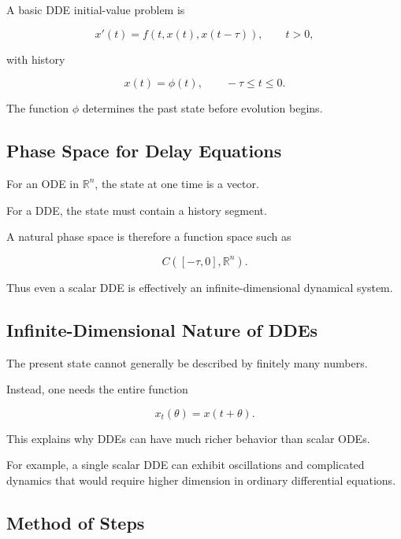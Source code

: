 A basic DDE initial-value problem is

\[
\boxed{
x'(t)
=
f
\left(
t,
x(t),
x(t-\tau)
\right),
\qquad
t>0,
}
\]

with history

\[
\boxed{
x(t)
=
\phi(t),
\qquad
-\tau\leq t\leq0.
}
\]

The function \(\phi\) determines the past state before evolution begins.

\subsection{Phase Space for Delay Equations}
\label{subsec:dde-phase-space}

For an ODE in \(\mathbb{R}^n\), the state at one time is a vector.

For a DDE, the state must contain a history segment.

A natural phase space is therefore a function space such as

\[
\boxed{
C
\left(
[-\tau,0],
\mathbb{R}^n
\right).
}
\]

Thus even a scalar DDE is effectively an infinite-dimensional dynamical
system.

\subsection{Infinite-Dimensional Nature of DDEs}
\label{subsec:dde-infinite-dimensional}

The present state cannot generally be described by finitely many numbers.

Instead, one needs the entire function

\[
\boxed{
x_t(\theta)
=
x(t+\theta).
}
\]

This explains why DDEs can have much richer behavior than scalar ODEs.

For example, a single scalar DDE can exhibit oscillations and complicated
dynamics that would require higher dimension in ordinary differential
equations.

\subsection{Method of Steps}
\label{subsec:method-of-steps}

